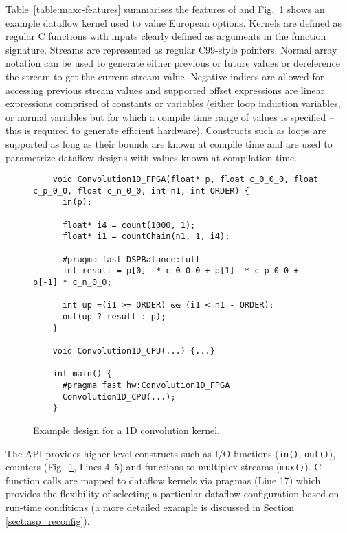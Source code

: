 Table~\ref{table:maxc-features} summarises the features of \MAXC{} and
Fig.~\ref{fig:maxc-1dconv} shows an example dataflow kernel used to
value European options. Kernels are defined as regular C functions
with inputs clearly defined as arguments in the function
signature. Streams are represented as regular C99-style pointers.
Normal array notation can be used to generate either previous or
future values or dereference the stream to get the current stream
value. Negative indices are allowed for accessing previous stream
values and supported offset expressions are linear expressions
comprised of constants or variables (either loop induction variables,
or normal variables but for which a compile time range of values is
specified -- this is required to generate efficient
hardware). Constructs such as loops are supported as long as their
bounds are known at compile time and are used to parametrize dataflow
designs with values known at compilation time.

\lstset{style=MaxC}

\begin{figure}[!h]
  \begin{lstlisting}
    void Convolution1D_FPGA(float* p, float c_0_0_0, float c_p_0_0, float c_n_0_0, int n1, int ORDER) {
      in(p);

      float* i4 = count(1000, 1);
      float* i1 = countChain(n1, 1, i4);

      #pragma fast DSPBalance:full
      int result = p[0]  * c_0_0_0 + p[1]  * c_p_0_0 + p[-1] * c_n_0_0;

      int up =(i1 >= ORDER) && (i1 < n1 - ORDER);
      out(up ? result : p);
    }

    void Convolution1D_CPU(...) {...}

    int main() {
      #pragma fast hw:Convolution1D_FPGA
      Convolution1D_CPU(...);
    }
  \end{lstlisting}
  \caption{Example \MAXC{} design for a 1D convolution kernel.}
  \label{fig:maxc-1dconv}
\end{figure}


The \MAXC{} API provides higher-level constructs such as I/O
functions (\texttt{in()}, \texttt{out()}), counters
(Fig.~\ref{fig:maxc-1dconv}, Lines 4--5) and functions to multiplex
streams (\texttt{mux()}). C function calls are mapped to dataflow
kernels via pragmas (Line 17) which provides the flexibility of
selecting a particular dataflow configuration based on run-time
conditions (a more detailed example is discussed in Section
\ref{sect:asp_reconfig}).
